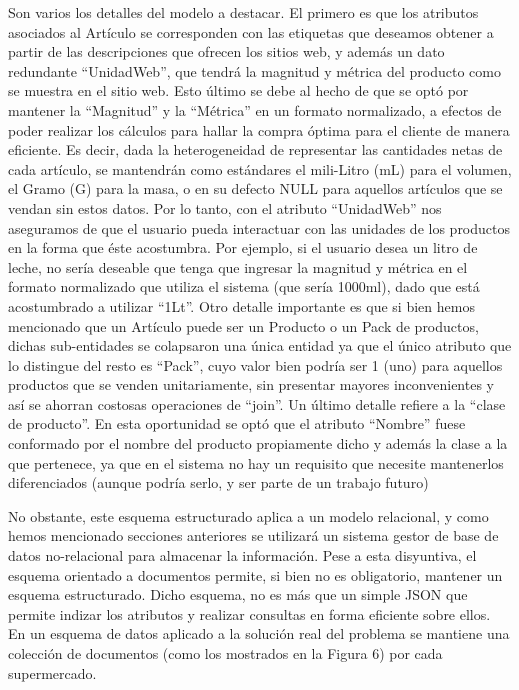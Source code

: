 \documentclass[12pt]{article} %
\begin{document}
Son varios los detalles del modelo a destacar. El primero es que los atributos asociados al Artículo se corresponden con las etiquetas que deseamos obtener a partir de las descripciones que ofrecen los sitios web, y además un dato redundante “UnidadWeb”, que tendrá la magnitud y métrica del producto como se muestra en el sitio web. Esto último se debe al hecho de que se optó por mantener la “Magnitud” y la “Métrica” en un formato normalizado, a efectos de poder realizar los cálculos para hallar la compra óptima para el cliente de manera eficiente. Es decir, dada la heterogeneidad de representar las cantidades netas de cada artículo, se mantendrán como estándares el mili-Litro (mL) para el volumen, el Gramo (G) para la masa, o en su defecto NULL para aquellos artículos que se vendan sin estos datos. Por lo tanto, con el atributo “UnidadWeb” nos aseguramos de que el usuario pueda interactuar con las unidades de los productos en la forma que éste acostumbra. Por ejemplo, si el usuario desea un litro de leche, no sería deseable que tenga que ingresar la magnitud y métrica en el formato normalizado que utiliza el sistema (que sería 1000ml), dado que está acostumbrado a utilizar “1Lt”. Otro detalle importante es que si bien hemos mencionado que un Artículo puede ser un Producto o un Pack de productos, dichas sub-entidades se colapsaron una única entidad ya que el único atributo que lo distingue del resto es “Pack”, cuyo valor bien podría ser 1 (uno) para aquellos productos que se venden unitariamente, sin presentar mayores inconvenientes y así se ahorran costosas operaciones de “join”. Un último detalle refiere a la “clase de producto”. En esta oportunidad se optó que el atributo “Nombre” fuese conformado por el nombre del producto propiamente dicho y además la clase a la que pertenece, ya que en el sistema no hay un requisito que necesite mantenerlos diferenciados (aunque podría serlo, y ser parte de un trabajo futuro)

No obstante, este esquema estructurado aplica a un modelo relacional, y como hemos mencionado secciones anteriores se utilizará un sistema gestor de base de datos no-relacional para almacenar la información. Pese a esta disyuntiva, el esquema orientado a documentos permite, si bien no es obligatorio, mantener un esquema estructurado. Dicho esquema, no es más que un simple JSON que permite indizar los atributos y realizar consultas en forma eficiente sobre ellos. En un esquema de datos aplicado a la solución real del problema se mantiene una colección de documentos (como los mostrados en la Figura 6) por cada supermercado.
\end{document}
